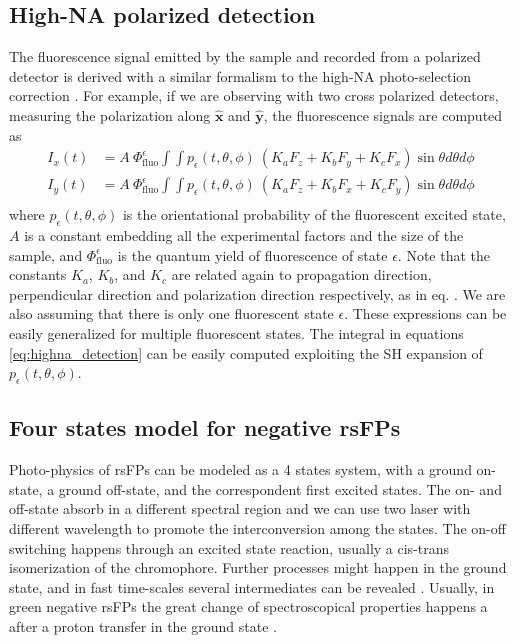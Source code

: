 \documentclass{article}
\begin{document}
\subsection{High-NA polarized detection}
The fluorescence signal emitted by the sample and recorded from a polarized detector is derived with a similar formalism to the high-NA photo-selection correction \cite{Fisz2005}. For example, if we are observing with two cross polarized detectors, measuring the polarization along $\hat{\mathbf{x}}$ and $\hat{\mathbf{y}}$, the fluorescence signals are computed as
\begin{equation}\label{eq:highna_detection}
\begin{aligned}
    I_x(t) &= A \ \Phi_\text{fluo}^\epsilon
    \int\int 
    p_\epsilon(t,\theta,\phi) \
    \left(K_a F_z + K_b F_y + K_c F_x\right)
    \sin\theta d\theta d\phi \\
    I_y(t) &= A \ \Phi_\text{fluo}^\epsilon
    \int\int 
    p_\epsilon(t,\theta,\phi) \
    \left(K_a F_z + K_b F_x + K_c F_y\right)
    \sin\theta d\theta d\phi \\
\end{aligned}
\end{equation}
where $p_\epsilon(t,\theta,\phi)$ is the orientational probability of the fluorescent excited state, $A$ is a constant embedding all the experimental factors and the size of the sample, and $\Phi_\text{fluo}^\epsilon$ is the quantum yield of fluorescence of state $\epsilon$. Note that the constants $K_a$, $K_b$, and $K_c$ are related again to propagation direction, perpendicular direction and polarization direction respectively, as in eq. . We are also assuming that there is only one fluorescent state $\epsilon$. These expressions can be easily generalized for multiple fluorescent states. The integral in equations \ref{eq:highna_detection} can be easily computed exploiting the SH expansion of $p_\epsilon(t,\theta,\phi)$.

\subsection{Four states model for negative rsFPs}
Photo-physics of rsFPs can be modeled as a 4 states system, with a ground on-state, a ground off-state, and the correspondent first excited states. The on- and off-state absorb in a different spectral region and we can use two laser with different wavelength to promote the interconversion among the states. The on-off switching happens through an excited state reaction, usually a cis-trans isomerization of the chromophore. Further processes might happen in the ground state, and in fast time-scales several intermediates can be revealed \cite{Laptenok2018, Woodhouse2020}. Usually, in green negative rsFPs the great change of spectroscopical properties happens a after a proton transfer in the ground state \cite{Nienhaus2016}.
\end{document}

